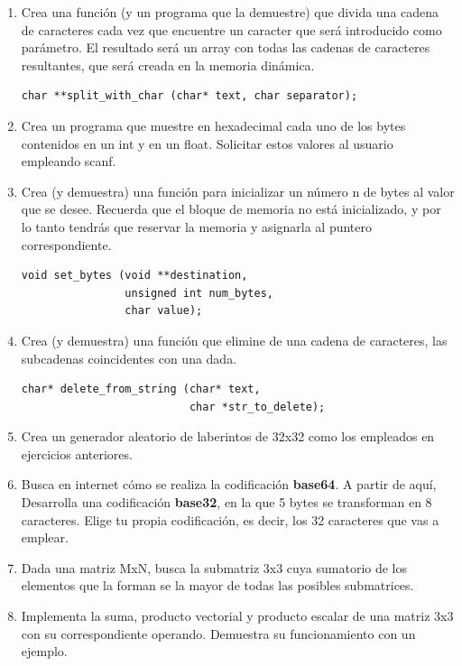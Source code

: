 \documentclass[a4paper,oneside]{article}
\begin{document}
  \begin{enumerate}
  
  \item Crea una función (y un programa que la demuestre) que divida una cadena de caracteres cada vez que encuentre un caracter que será introducido como parámetro. El resultado será un array con todas las cadenas de caracteres resultantes, que será creada en la memoria dinámica.

  \begin{verbatim}
char **split_with_char (char* text, char separator);
  \end{verbatim}
  
  \item Crea un programa que muestre en hexadecimal cada uno de los bytes contenidos en un int y en un float. Solicitar estos valores al usuario empleando scanf.

  \item Crea (y demuestra) una función para inicializar un número n de bytes al valor que se desee. Recuerda que el bloque de memoria no está inicializado, y por lo tanto tendrás que reservar la memoria y asignarla al puntero correspondiente.

  \begin{verbatim}
void set_bytes (void **destination,
                unsigned int num_bytes,
                char value);
  \end{verbatim}

  \item Crea (y demuestra) una función que elimine de una cadena de caracteres, las subcadenas coincidentes con una dada.

  \begin{verbatim}
char* delete_from_string (char* text,
                          char *str_to_delete);
  \end{verbatim}

  \item Crea un generador aleatorio de laberintos de 32x32 como los empleados en ejercicios anteriores.

  \item Busca en internet cómo se realiza la codificación \textbf{base64}. A partir de aquí, Desarrolla una codificación \textbf{base32}, en la que 5 bytes se transforman en 8 caracteres. Elige tu propia codificación, es decir, los 32 caracteres que vas a emplear.

  \item Dada una matriz MxN, busca la submatriz 3x3 cuya sumatorio de los elementos que la forman se la mayor de todas las posibles submatrices.

  \item Implementa la suma, producto vectorial y producto escalar de una matriz 3x3 con su correspondiente operando. Demuestra su funcionamiento con un ejemplo.

  \end{enumerate}
\end{document}
